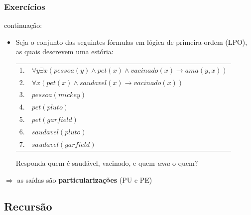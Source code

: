\documentclass[10pt]{beamer}
\begin{document}
\begin{frame}[fragile]%
 \frametitle{Exercícios}

\begin{block}{continuação:}

\begin{itemize}

\item Seja o conjunto das seguintes fórmulas em lógica de primeira-ordem (LPO), as quais descrevem uma estória:
\begin{small}

\begin{tabular}{ll}
 \hline \hline
    1. &  $\forall y \exists x ( pessoa(y) \wedge pet(x) \wedge vacinado(x) \rightarrow ama(y, x) )$ \\
    2. &  $ \forall x ( pet(x) \wedge saudavel(x) \rightarrow vacinado(x) ) $ \\
    3. &  $ pessoa(mickey) $ \\
    4. &  $ pet(pluto) $ \\
    5. &  $ pet(garfield) $ \\
    6. &  $ saudavel(pluto)$ \\
    7. &  $ saudavel(garfield)$ \\
    \hline \hline
 \end{tabular}
Responda quem é saudável, vacinado, e quem \textit{ama} o quem?

\end{small}
\end{itemize}

\end{block}

   $\Rightarrow $ as saídas são \textbf{particularizações} (PU e PE)
 
\end{frame}


\subsection{Recursão}
\end{document}
